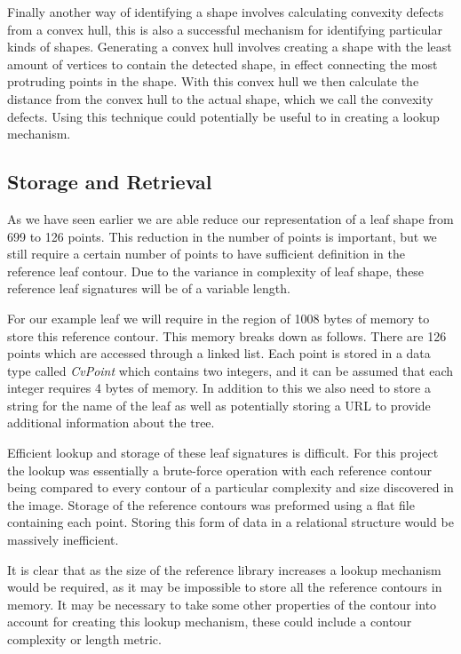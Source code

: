 Finally another way of identifying a shape involves calculating convexity defects from a convex hull, this is also a successful mechanism for identifying particular kinds of shapes. Generating a convex hull involves creating a shape with the least amount of vertices to contain the detected shape, in effect connecting the most protruding points in the shape. With this convex hull we then calculate the distance from the convex hull to the actual shape, which we call the convexity defects. Using this technique could potentially be useful to in creating a lookup mechanism.

\subsection{Storage and Retrieval}
As we have seen earlier we are able reduce our representation of a leaf shape from 699 to 126 points. This reduction in the number of points is important, but we still require a certain number of points to have sufficient definition in the reference leaf contour. Due to the variance in complexity of leaf shape, these reference leaf signatures will be of a variable length.

For our example leaf we will require in the region of 1008 bytes of memory to store this reference contour. This memory breaks down as follows. There are 126 points which are accessed through a linked list. Each point is stored in a data type called \emph{CvPoint} which contains two integers, and it can be assumed that each integer requires 4 bytes of memory. In addition to this we also need to store a string for the name of the leaf as well as potentially storing a URL to provide additional information about the tree.

Efficient lookup and storage of these leaf signatures is difficult. For this project the lookup was essentially a brute-force operation with each reference contour being compared to every contour of a particular complexity and size discovered in the image. Storage of the reference contours was preformed using a flat file containing each point. Storing this form of data in a relational structure would be massively inefficient.

It is clear that as the size of the reference library increases a lookup mechanism would be required, as it may be impossible to store all the reference contours in memory. It may be necessary to take some other properties of the contour into account for creating this lookup mechanism, these could include a contour complexity or length metric. 



